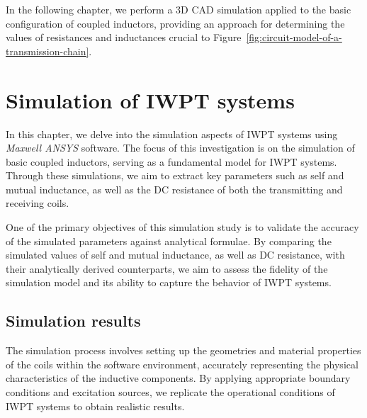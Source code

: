 \documentclass[11pt,a4paper,twoside,openany]{report}
\begin{document}
        In the following chapter, we perform a 3D CAD simulation applied to the basic configuration of coupled inductors, providing an approach for determining the values of resistances and inductances crucial to Figure~\ref{fig:circuit-model-of-a-transmission-chain}.

    \chapter{Simulation of IWPT systems}
    \label{chap:simulation-of-iwpt-systems}

    In this chapter, we delve into the simulation aspects of IWPT systems using \emph{Maxwell ANSYS} software. The focus of this investigation is on the simulation of basic coupled inductors, serving as a fundamental model for IWPT systems. Through these simulations, we aim to extract key parameters such as self and mutual inductance, as well as the DC resistance of both the transmitting and receiving coils.

    One of the primary objectives of this simulation study is to validate the accuracy of the simulated parameters against analytical formulae. By comparing the simulated values of self and mutual inductance, as well as DC resistance, with their analytically derived counterparts, we aim to assess the fidelity of the simulation model and its ability to capture the behavior of IWPT systems.

    \section{Simulation results}

        The simulation process involves setting up the geometries and material properties of the coils within the software environment, accurately representing the physical characteristics of the inductive components. By applying appropriate boundary conditions and excitation sources, we replicate the operational conditions of IWPT systems to obtain realistic results.
\end{document}

